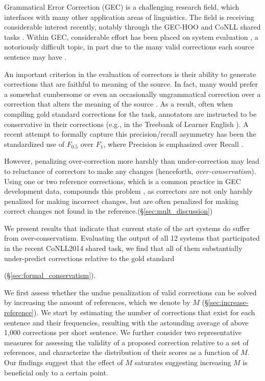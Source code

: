 \documentclass[letter,11pt]{article}
\begin{document}
Grammatical Error Correction (GEC) is a challenging research field, which interfaces with many
other application areas of linguistics. The field is receiving considerable
interest recently, notably through the GEC-HOO \cite{dale2011helping,dale2012hoo} and
CoNLL shared tasks \cite{kao2013conll,ng2014conll}.
Within GEC, considerable effort has been placed on system evaluation
\cite{tetreault2008native,madnani2011they,dahlmeier2012better,felice2015towards,napoles2015ground},
a notoriously difficult topic,
in part due to the many valid corrections each source sentence may have \cite{chodorow2012problems}.

An important criterion in the evaluation of correctors
is their ability to generate corrections that are faithful to meaning of the source. In fact, many would prefer
a somewhat cumbersome or even an occasionally ungrammatical correction over a correction
that alters the meaning of the source \cite{brockett2006correcting}.
As a result, often when compiling gold standard corrections for the task,
annotators are instructed to be conservative in their corrections
(e.g., in the Treebank of Learner English \cite{nicholls2003cambridge}).
A recent attempt to formally capture this precision/recall asymmetry has
been the standardized use of $F_{0.5}$ over $F_{1}$, where Precision is
emphasized over Recall \cite{dahlmeier2012better}.

However, penalizing over-correction more harshly than under-correction
may lead to reluctance of correctors to
make any changes (henceforth, {\it over-conservatism}).
Using one or two reference corrections, which is a common practice in GEC {\color{red}development data}, compounds this problem \cite{bryant2015far},
as correctors are not only harshly penalized for making incorrect changes,
but are often penalized for making correct changes not found in the reference.(\S \ref{sec:mult_discussion})

We present results that indicate that current state of the art systems do suffer
from over-conservatism. Evaluating the output of all 12 systems that participated
in the recent CoNLL2014 shared task, we find that all of them
substantially under-predict corrections relative to the gold standard

(\S \ref{sec:formal_conservatism}).

{\color{red}
	We first assess whether the undue penalization of valid corrections can be solved by increasing the amount of references, which we denote by $M$ (\S \ref{sec:increase-reference}).
We start by estimating the number of corrections that exist for each sentence and their frequencies, resulting with the astounding average of above 1,000 corrections per short sentence. }
We further consider two representative measures for assessing the validity of a proposed correction relative to a set of references,
and characterize the distribution of their scores as a function of $M$. 
{\color{red} 
Our findings suggest that the effect of $M$ saturates suggesting increasing $M$ is beneficial only to a certain point.}
\end{document}
